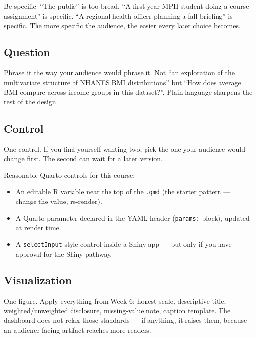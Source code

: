 \documentclass[
  letterpaper,
  DIV=11,
  numbers=noendperiod,
  oneside]{scrreprt}
\providecommand{\tightlist}{%
  \setlength{\itemsep}{0pt}\setlength{\parskip}{0pt}}
\begin{document}
Be specific. ``The public'' is too broad. ``A first-year MPH student
doing a course assignment'' is specific. ``A regional health officer
planning a fall briefing'' is specific. The more specific the audience,
the easier every later choice becomes.

\subsection*{Question}\label{question}

Phrase it the way your audience would phrase it. Not ``an exploration of
the multivariate structure of NHANES BMI distributions'' but ``How does
average BMI compare across income groups in this dataset?''. Plain
language sharpens the rest of the design.

\subsection*{Control}\label{control}

One control. If you find yourself wanting two, pick the one your
audience would change first. The second can wait for a later version.

Reasonable Quarto controls for this course:

\begin{itemize}
\tightlist
\item
  An editable R variable near the top of the \texttt{.qmd} (the starter
  pattern --- change the value, re-render).
\item
  A Quarto parameter declared in the YAML header (\texttt{params:}
  block), updated at render time.
\item
  A \texttt{selectInput}-style control inside a Shiny app --- but only
  if you have approval for the Shiny pathway.
\end{itemize}

\subsection*{Visualization}\label{visualization}

One figure. Apply everything from Week 6: honest scale, descriptive
title, weighted/unweighted disclosure, missing-value note, caption
template. The dashboard does not relax those standards --- if anything,
it raises them, because an audience-facing artifact reaches more
readers.
\end{document}
